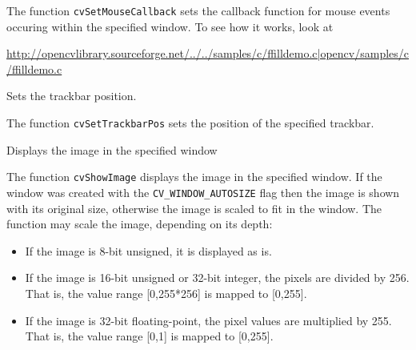 The function \texttt{cvSetMouseCallback} sets the callback function for mouse events occuring within the specified window. To see how it works, look at 

\url{http://opencvlibrary.sourceforge.net/../../samples/c/ffilldemo.c|opencv/samples/c/ffilldemo.c} 

Sets the trackbar position.


\begin{description}
\end{description}

The function \texttt{cvSetTrackbarPos} sets the position of the specified trackbar.

Displays the image in the specified window


\begin{description}
\end{description}

The function \texttt{cvShowImage} displays the image in the specified window. If the window was created with the \texttt{CV\_WINDOW\_AUTOSIZE} flag then the image is shown with its original size, otherwise the image is scaled to fit in the window. The function may scale the image, depending on its depth:
\begin{itemize}
    \item If the image is 8-bit unsigned, it is displayed as is.
    \item If the image is 16-bit unsigned or 32-bit integer, the pixels are divided by 256. That is, the value range [0,255*256] is mapped to [0,255].
    \item If the image is 32-bit floating-point, the pixel values are multiplied by 255. That is, the value range [0,1] is mapped to [0,255].
\end{itemize}

